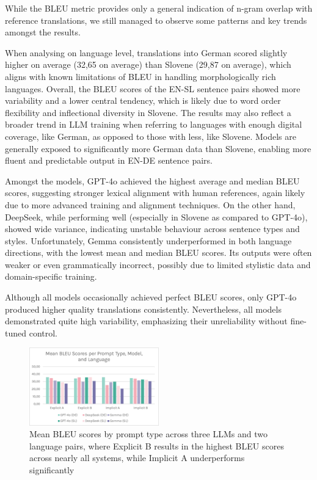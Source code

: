 \documentclass[fleqn,moreauthors,10pt]{ds_report}
\begin{document}
	While the BLEU metric provides only a general indication of n-gram overlap with reference translations, we still managed to observe some patterns and key trends amongst the results.
	
	When analysing on language level, translations into German scored slightly higher on average (32,65 on average) than Slovene (29,87 on average), which aligns with known limitations of BLEU in handling morphologically rich languages. Overall, the BLEU scores of the EN-SL sentence pairs showed more variability and a lower central tendency, which is likely due to word order flexibility and inflectional diversity in Slovene. The results may also reflect a broader trend in LLM training when referring to languages with enough digital coverage, like German, as opposed to those with less, like Slovene. Models are generally exposed to significantly more German data than Slovene, enabling more fluent and predictable output in EN-DE sentence pairs.
	
	Amongst the models, GPT-4o achieved the highest average and median BLEU scores, suggesting stronger lexical alignment with human references, again likely due to more advanced training and alignment techniques. On the other hand, DeepSeek, while performing well (especially in Slovene as compared to GPT-4o), showed wide variance, indicating unstable behaviour across sentence types and styles. Unfortunately, Gemma consistently underperformed in both language directions, with the lowest mean and median BLEU scores. Its outputs were often weaker or even grammatically incorrect, possibly due to limited stylistic data and domain-specific training.
	
	Although all models occasionally achieved perfect BLEU scores, only GPT-4o produced higher quality translations consistently. Nevertheless, all models demonstrated quite high variability, emphasizing their unreliability without fine-tuned control.
	
	
	\begin{figure}[h]
		\centering
		\includegraphics[width=0.5\textwidth]{image1.png}
		\caption{Mean BLEU scores by prompt type across three LLMs and two language pairs, where Explicit B results in the highest BLEU scores across nearly all systems, while Implicit A underperforms significantly}		
		\label{Figure 2}
	\end{figure}
\end{document}
